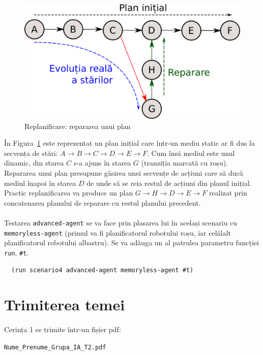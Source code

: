\documentclass[12pt]{article}
\newcommand{\repr}[1]{{\color{sapphire}\texttt{#1}}}
\begin{document}
\begin{figure}[h!]
  \centering
  \includegraphics[width=.5\textwidth]{graphics/replan.pdf}
  \caption{Replanificare: repararea unui plan}
  \label{fig:repair}
\end{figure}

În Figura~\ref{fig:repair} este reprezentat un plan inițial care
într-un mediu static ar fi dus la secvența de stări: $A \rightarrow B
\rightarrow C \rightarrow D \rightarrow E \rightarrow F$. Cum însă
mediul este unul dinamic, din starea $C$ s-a ajuns în starea $G$
(tranziția marcată cu roșu). Repararea unui plan presupune găsirea
unei secvențe de acțiuni care să ducă mediul înapoi în starea $D$ de
unde să se reia restul de acțiuni din planul inițial. Practic
replanificarea va produce un plan $G \rightarrow H \rightarrow D
\rightarrow E \rightarrow F$ realizat prin concatenarea planului de
reparare cu restul planului precedent.

\paragraph{}

Testarea \repr{advanced-agent} se va face prin plasarea lui în același
scenariu cu \repr{memoryless-agent} (primul va fi planificatorul
robotului roșu, iar celălalt planificatorul robotului albastru). Se va
adăuga un al patrulea parametru funcției \repr{run}, \repr{\#t}.

\begin{verbatim}
  (run scenario4 advanced-agent memoryless-agent #t)
\end{verbatim}

\section{Trimiterea temei}
\label{sec:send}

\paragraph{}

Cerința 1 se trimite într-un fișier pdf:
\begin{center}
  \texttt{Nume\_Prenume\_Grupa\_IA\_T2.pdf}
\end{center}
\end{document}
